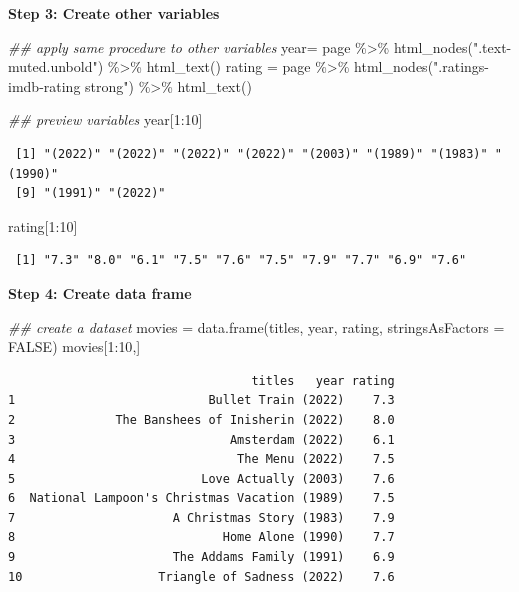 \documentclass[
  letterpaper,
  DIV=11,
  numbers=noendperiod]{scrreprt}
\newenvironment{Shaded}{\begin{snugshade}}{\end{snugshade}}
\newcommand{\AttributeTok}[1]{\textcolor[rgb]{0.40,0.45,0.13}{#1}}
\newcommand{\ConstantTok}[1]{\textcolor[rgb]{0.56,0.35,0.01}{#1}}
\newcommand{\DecValTok}[1]{\textcolor[rgb]{0.68,0.00,0.00}{#1}}
\newcommand{\DocumentationTok}[1]{\textcolor[rgb]{0.37,0.37,0.37}{\textit{#1}}}
\newcommand{\FunctionTok}[1]{\textcolor[rgb]{0.28,0.35,0.67}{#1}}
\newcommand{\NormalTok}[1]{\textcolor[rgb]{0.00,0.23,0.31}{#1}}
\newcommand{\OtherTok}[1]{\textcolor[rgb]{0.00,0.23,0.31}{#1}}
\newcommand{\SpecialCharTok}[1]{\textcolor[rgb]{0.37,0.37,0.37}{#1}}
\newcommand{\StringTok}[1]{\textcolor[rgb]{0.13,0.47,0.30}{#1}}
\begin{document}
\textbf{Step 3: Create other variables}

\begin{Shaded}
\begin{Highlighting}[]
\DocumentationTok{\#\# apply same procedure to other variables}
\NormalTok{year}\OtherTok{=}\NormalTok{ page }\SpecialCharTok{\%\textgreater{}\%} \FunctionTok{html\_nodes}\NormalTok{(}\StringTok{".text{-}muted.unbold"}\NormalTok{) }\SpecialCharTok{\%\textgreater{}\%} \FunctionTok{html\_text}\NormalTok{()}
\NormalTok{rating }\OtherTok{=}\NormalTok{ page }\SpecialCharTok{\%\textgreater{}\%} \FunctionTok{html\_nodes}\NormalTok{(}\StringTok{".ratings{-}imdb{-}rating strong"}\NormalTok{) }\SpecialCharTok{\%\textgreater{}\%} \FunctionTok{html\_text}\NormalTok{()}


\DocumentationTok{\#\# preview variables}
\NormalTok{year[}\DecValTok{1}\SpecialCharTok{:}\DecValTok{10}\NormalTok{]}
\end{Highlighting}
\end{Shaded}

\begin{verbatim}
 [1] "(2022)" "(2022)" "(2022)" "(2022)" "(2003)" "(1989)" "(1983)" "(1990)"
 [9] "(1991)" "(2022)"
\end{verbatim}

\begin{Shaded}
\begin{Highlighting}[]
\NormalTok{rating[}\DecValTok{1}\SpecialCharTok{:}\DecValTok{10}\NormalTok{]}
\end{Highlighting}
\end{Shaded}

\begin{verbatim}
 [1] "7.3" "8.0" "6.1" "7.5" "7.6" "7.5" "7.9" "7.7" "6.9" "7.6"
\end{verbatim}

\textbf{Step 4: Create data frame}

\begin{Shaded}
\begin{Highlighting}[]
\DocumentationTok{\#\# create a dataset}
\NormalTok{movies }\OtherTok{=} \FunctionTok{data.frame}\NormalTok{(titles, year, rating, }\AttributeTok{stringsAsFactors =} \ConstantTok{FALSE}\NormalTok{)}
\NormalTok{movies[}\DecValTok{1}\SpecialCharTok{:}\DecValTok{10}\NormalTok{,]}
\end{Highlighting}
\end{Shaded}

\begin{verbatim}
                                  titles   year rating
1                           Bullet Train (2022)    7.3
2              The Banshees of Inisherin (2022)    8.0
3                              Amsterdam (2022)    6.1
4                               The Menu (2022)    7.5
5                          Love Actually (2003)    7.6
6  National Lampoon's Christmas Vacation (1989)    7.5
7                      A Christmas Story (1983)    7.9
8                             Home Alone (1990)    7.7
9                      The Addams Family (1991)    6.9
10                   Triangle of Sadness (2022)    7.6
\end{verbatim}
\end{document}
